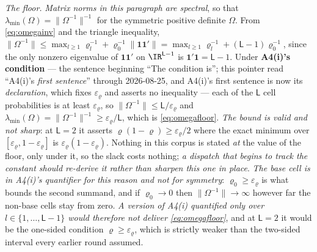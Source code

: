 \emph{The floor.} \emph{Matrix norms in this paragraph are spectral}, so that
$\lambda_{\min}(\Omega)=\|\Omega^{-1}\|^{-1}$ for the symmetric positive definite $\Omega$. From
\eqref{eq:omegainv} and the triangle inequality,
$\|\Omega^{-1}\|\le\max_{l\ge1}\varrho_l^{-1}+\varrho_0^{-1}\|\mathbf1\mathbf1'\|
=\max_{l\ge1}\varrho_l^{-1}+(\mathsf L-1)\varrho_0^{-1}$, since the only nonzero eigenvalue of
$\mathbf1\mathbf1'$ on $\IR^{\mathsf L-1}$ is $\mathbf1'\mathbf1=\mathsf L-1$. Under \textbf{A4(i)'s
condition} --- the sentence beginning ``The condition is''; this pointer read ``A4(i)'s \emph{first
sentence}'' through 2026-08-25, and A4(i)'s first sentence is now its \emph{declaration}, which fixes
$\varepsilon_\varrho$ and asserts no inequality --- each of the
$\mathsf L$ cell probabilities is at least $\varepsilon_\varrho$, so
$\|\Omega^{-1}\|\le\mathsf L/\varepsilon_\varrho$ and
$\lambda_{\min}(\Omega)=\|\Omega^{-1}\|^{-1}\ge\varepsilon_\varrho/\mathsf L$, which is
\eqref{eq:omegafloor}. \emph{The bound is valid and not sharp}: at $\mathsf L=2$ it asserts
$\varrho(1-\varrho)\ge\varepsilon_\varrho/2$ where the exact minimum over
$[\varepsilon_\varrho,1-\varepsilon_\varrho]$ is $\varepsilon_\varrho(1-\varepsilon_\varrho)$. Nothing in
this corpus is stated \emph{at} the value of the floor, only under it, so the slack costs nothing;
\emph{a dispatch that begins to track the constant should re-derive it rather than sharpen this one in
place}. \emph{The base cell is in A4(i)'s quantifier for this reason and not for symmetry}:
$\varrho_0\ge\varepsilon_\varrho$ is what bounds the second summand, and if $\varrho_0\to0$ then
$\|\Omega^{-1}\|\to\infty$ however far the non-base cells stay from zero. \emph{A version of A4(i)
quantified only over $l\in\{1,\dots,\mathsf L-1\}$ would therefore not deliver
\eqref{eq:omegafloor}}, and at $\mathsf L=2$ it would be the one-sided condition
$\varrho\ge\varepsilon_\varrho$, which is strictly weaker than the two-sided interval every earlier
round assumed.

